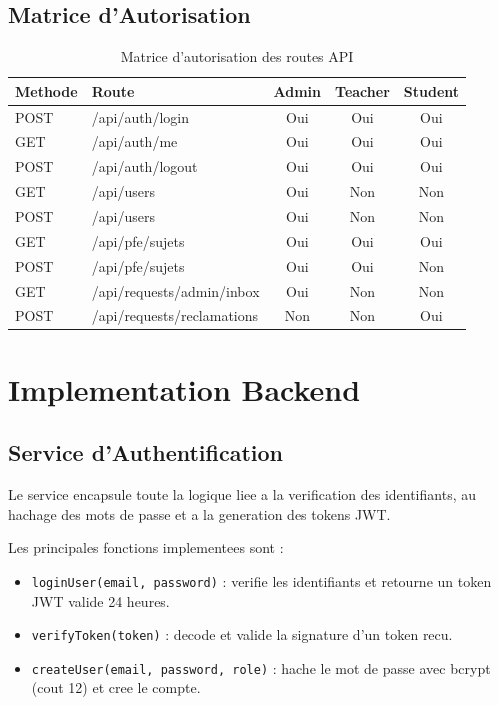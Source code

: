 \documentclass[12pt,a4paper]{report}
\begin{document}
\subsection{Matrice d'Autorisation}

\begin{table}[H]
\centering
\caption{Matrice d'autorisation des routes API}
\begin{tabular}{llccc}
\toprule
\textbf{Methode} & \textbf{Route} & \textbf{Admin} & \textbf{Teacher} & \textbf{Student} \\
\midrule
POST & /api/auth/login            & Oui & Oui & Oui \\
GET  & /api/auth/me               & Oui & Oui & Oui \\
POST & /api/auth/logout           & Oui & Oui & Oui \\
GET  & /api/users                 & Oui & Non & Non \\
POST & /api/users                 & Oui & Non & Non \\
GET  & /api/pfe/sujets            & Oui & Oui & Oui \\
POST & /api/pfe/sujets            & Oui & Oui & Non \\
GET  & /api/requests/admin/inbox  & Oui & Non & Non \\
POST & /api/requests/reclamations & Non & Non & Oui \\
\bottomrule
\end{tabular}
\end{table}

\section{Implementation Backend}

\subsection{Service d'Authentification}

Le service encapsule toute la logique liee a la verification des
identifiants, au hachage des mots de passe et a la generation des
tokens JWT.

Les principales fonctions implementees sont :
\begin{itemize}
  \item \texttt{loginUser(email, password)} : verifie les identifiants
        et retourne un token JWT valide 24 heures.
  \item \texttt{verifyToken(token)} : decode et valide la signature
        d'un token recu.
  \item \texttt{createUser(email, password, role)} : hache le mot de
        passe avec bcrypt (cout 12) et cree le compte.
\end{itemize}
\end{document}
